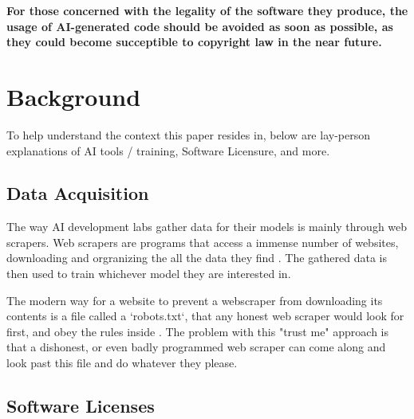\documentclass[journal]{IEEEtran}
\begin{document}
\textbf {
  For those concerned with the legality of the software they produce, the usage of
AI-generated code should be avoided as soon as possible, as they could become succeptible to
copyright law in the near future.
}

\section{Background}



To help understand the context this paper resides in,
below are lay-person explanations of AI tools / training, Software
Licensure, and more.

\subsection{Data Acquisition}

The way AI development labs gather data for their models is
mainly through web scrapers. Web scrapers are programs that access a
immense number of websites, downloading and orgranizing
the all the data they find \cite{Miquido}. The gathered data
is then used to train whichever model they are interested in. 

The modern way for a website to prevent a webscraper from
downloading its contents is a file called a `robots.txt`,
that any honest web scraper would look for first, and obey
the rules inside \cite{robots}. The problem with this "trust me" approach
is that a dishonest, or even badly programmed web scraper
can come along and look past this file and do whatever they please\cite{robots}.



\subsection{Software Licenses}

\end{document}
